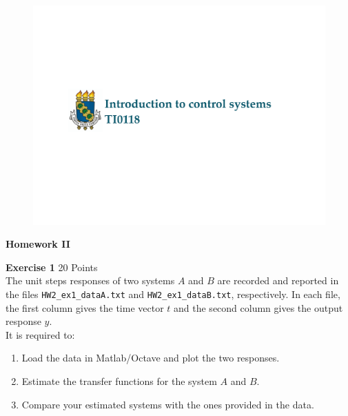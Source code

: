 \documentclass[a4paper,11pt]{article}
\begin{document}
\begin{figure}[!h] \includegraphics [scale=0.3] {Course-name} \end{figure}
{\Large \noindent \bf Homework II} 

\vskip0.8cm

{\Large \noindent \bf Exercise 1} \hfill					20 Points\\

\noindent The unit steps responses of two systems $A$ and $B$ are recorded and reported in the files {\tt HW2\_ex1\_dataA.txt} and  {\tt HW2\_ex1\_dataB.txt}, respectively. In each file, the first column gives the time vector $t$ and the second column gives the output response $y$. \\

\noindent It is required to:
\begin{enumerate}
\item Load the data in Matlab/Octave and plot the two responses.
\item Estimate the transfer functions for the system $A$ and $B$. 
\item Compare your estimated systems with the ones provided in the data.
\end{enumerate}

\vskip0.5cm
\end{document}
